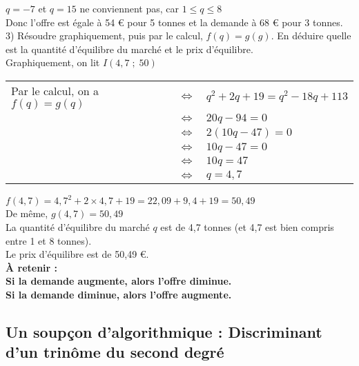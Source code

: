 \vspace*{.3cm}

$q = -7$ et $q = 15$ ne conviennent pas, car $1 \leqslant q \leqslant 8$ \\

Donc l'offre est égale à 54 € pour 5 tonnes et la demande à 68 € pour 3 tonnes. \\

3) Résoudre graphiquement, puis par le calcul, $f(q) = g(g)$. En déduire quelle est la quantité d'équilibre du marché et le prix d'équilibre. \\

Graphiquement, on lit $I\left(4,7\; ; \; 50\right)$ \\

\begin{tabular}{lll}
Par le calcul, on a $f(q) = g(q)$ & $\Longleftrightarrow$ & $q^2 + 2q + 19 = q^2 - 18q + 113$ \\
& $\Longleftrightarrow$ & $20q - 94 = 0$ \\
& $\Longleftrightarrow$ & $2\left(10q - 47\right) = 0$ \\
& $\Longleftrightarrow$ & $10q - 47 = 0$ \\
& $\Longleftrightarrow$ & $10q = 47$ \\
& $\Longleftrightarrow$ & $q = 4,7$ \\
\end{tabular}

\vspace*{.3cm}

$f(4,7) = 4,7^2 + 2 \times 4,7 + 19 = 22,09 + 9,4 + 19 = 50,49$ \\

De même, $g(4,7) = 50,49$ \\

La quantité d'équilibre du marché $q$ est de 4,7 tonnes (et 4,7 est bien compris entre 1 et 8 tonnes). \\ Le prix d'équilibre est de 50,49 €. \\

\textbf{À retenir :} \\

\textbf{Si la demande augmente, alors l'offre diminue. \\ Si la demande diminue, alors l'offre augmente.}

\newpage

\subsection{Un soupçon d'algorithmique : Discriminant d'un trinôme du second degré}
 
